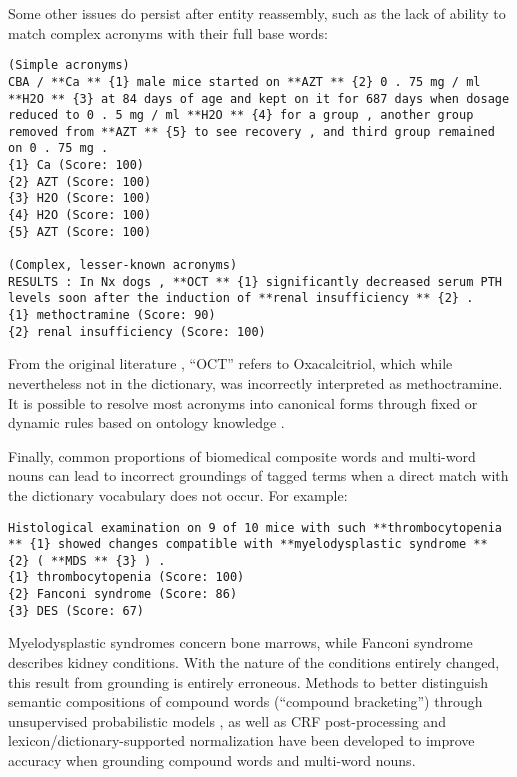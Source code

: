 \documentclass[10pt, oneside]{article}
\begin{document}
Some other issues do persist after entity reassembly, such as the lack of ability to match complex acronyms with their full base words:

\begin{lstlisting}[breaklines]
(Simple acronyms)
CBA / **Ca ** {1} male mice started on **AZT ** {2} 0 . 75 mg / ml **H2O ** {3} at 84 days of age and kept on it for 687 days when dosage reduced to 0 . 5 mg / ml **H2O ** {4} for a group , another group removed from **AZT ** {5} to see recovery , and third group remained on 0 . 75 mg . 
{1} Ca (Score: 100)
{2} AZT (Score: 100)
{3} H2O (Score: 100)
{4} H2O (Score: 100)
{5} AZT (Score: 100)

(Complex, lesser-known acronyms)
RESULTS : In Nx dogs , **OCT ** {1} significantly decreased serum PTH levels soon after the induction of **renal insufficiency ** {2} . 
{1} methoctramine (Score: 90)
{2} renal insufficiency (Score: 100)
\end{lstlisting}

From the original literature \cite{monier199922}, ``OCT'' refers to Oxacalcitriol, which while nevertheless not in the dictionary, was incorrectly interpreted as methoctramine. It is possible to resolve most acronyms into canonical forms through fixed or dynamic rules based on ontology knowledge \cite{naderi2011organismtagger}.

Finally, common proportions of biomedical composite words and multi-word nouns can lead to incorrect groundings of tagged terms when a direct match with the dictionary vocabulary does not occur. For example:

\begin{lstlisting}[breaklines]
Histological examination on 9 of 10 mice with such **thrombocytopenia ** {1} showed changes compatible with **myelodysplastic syndrome ** {2} ( **MDS ** {3} ) . 
{1} thrombocytopenia (Score: 100)
{2} Fanconi syndrome (Score: 86)
{3} DES (Score: 67)
\end{lstlisting}

Myelodysplastic syndromes concern bone marrows, while Fanconi syndrome describes kidney conditions. With the nature of the conditions entirely changed, this result from grounding is entirely erroneous. Methods to better distinguish semantic compositions of compound words (``compound bracketing'') through unsupervised probabilistic models \cite{pecina2010lexical}, as well as CRF post-processing and lexicon/dictionary-supported normalization \cite{lee2016audis} have been developed to improve accuracy when grounding compound words and multi-word nouns.
\end{document}

